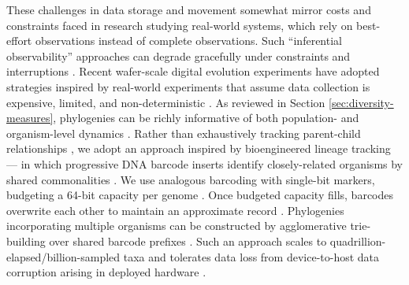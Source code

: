 These challenges in data storage and movement somewhat mirror costs and constraints faced in research studying real-world systems, which rely on best-effort observations instead of complete observations.
Such ``inferential observability'' approaches can degrade gracefully under constraints and interruptions \citep{moreno2027trust}.
Recent wafer-scale digital evolution experiments have adopted strategies inspired by real-world experiments that assume data collection is expensive, limited, and non-deterministic \citep{moreno2024trackable,moreno2025mutator}.
As reviewed in Section \ref{sec:diversity-measures}, phylogenies can be richly informative of both population- and organism-level dynamics \citep{genthon2023cell, levy2015quantitative,stadler2013recovering,moreno2025ecology,lewinsohn2023statedependent,nozoe2017inferring}.
Rather than exhaustively tracking parent-child relationships \citep{dolson2024phylotrackpy}, we adopt an approach inspired by bioengineered lineage tracking \citep{moreno2022hereditary} --- in which progressive DNA barcode inserts identify closely-related organisms by shared commonalities \citep{masuyama2019dna,wagner2020lineage,mckenna2016wholeorganism,kebschull2018cellular,askary2024lives,sashittal2023startle,kong2020celltagging,chow2021imaging,chen2022connecting,choi2022timeresolved,kalhor2016rapidly}.
We use analogous barcoding with single-bit markers, budgeting a 64-bit capacity per genome \citep{moreno2025testing}.
Once budgeted capacity fills, barcodes overwrite each other to maintain an approximate record \citep{moreno2024algorithms}.
Phylogenies incorporating multiple organisms can be constructed by agglomerative trie-building over shared barcode prefixes \citep{moreno2023toward}.
Such an approach scales to quadrillion-elapsed/billion-sampled taxa \citep{singhvi2025scalable} and tolerates data loss from device-to-host data corruption arising in deployed hardware \citep{moreno2027trust}.

